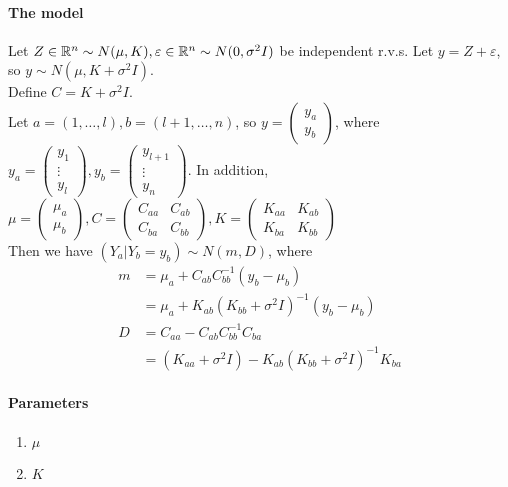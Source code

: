 \documentclass[11pt]{article}
\begin{document}
\paragraph{The model}
Let $Z \in \mathbb{R}^n \sim N(\mu, K), \varepsilon \in \mathbb{R}^n \sim N(0, \sigma^2I)$ be independent r.v.s. Let $y = Z + \varepsilon$, so $y \sim N(\mu, K+\sigma^2I)$.\\
Define $C = K + \sigma^2 I$.\\
Let $a = (1, \hdots, l), b = (l+1, \hdots, n)$, so $y = \begin{pmatrix}
	y_a \\ y_b \end{pmatrix}$, where $y_a = \begin{pmatrix} y_1 \\ \vdots \\y_l
	\end{pmatrix}, y_b = \begin{pmatrix} y_{l+1} \\ \vdots \\ y_n \end{pmatrix}$.
	In addition, $\mu = \begin{pmatrix} \mu_a \\ \mu_b \end{pmatrix}, C = \begin{pmatrix} C_{aa} & C_{ab} \\ C_{ba} & C_{bb} \end{pmatrix}, K = \begin{pmatrix} K_{aa} & K_{ab} \\ K_{ba} & K_{bb} \end{pmatrix}$\\
Then we have $(Y_a | Y_b = y_b) \sim N(m, D)$, where 
\begin{align*}
	m &= \mu_a + C_{ab}C^{-1}_{bb}(y_b - \mu_b) \\
	&= \mu_a +K_{ab}(K_{bb} + \sigma^2 I)^{-1}(y_b - \mu_b)\\
	D &= C_{aa} - C_{ab}C^{-1}_{bb}C_{ba} \\
	&= (K_{aa}+\sigma^2 I)-K_{ab}(K_{bb}+\sigma^2I)^{-1}K_{ba}
\end{align*}
\paragraph{Parameters}
\begin{enumerate}
	\item $\mu$
	\item $K$
\end{enumerate}
\end{document}
